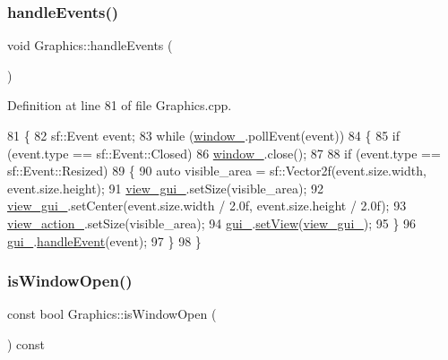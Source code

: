 \subsubsection{\texorpdfstring{handle\+Events()}{handleEvents()}}
{\footnotesize\ttfamily void Graphics\+::handle\+Events (\begin{DoxyParamCaption}{ }\end{DoxyParamCaption})}



Definition at line 81 of file Graphics.\+cpp.


\begin{DoxyCode}
81                             \{
82     sf::Event event;
83     \textcolor{keywordflow}{while} (\hyperlink{classGraphics_ac760fe1abb0b648844c9f15afa087ef6}{window\_}.pollEvent(event))
84     \{
85         \textcolor{keywordflow}{if} (event.type == sf::Event::Closed)
86             \hyperlink{classGraphics_ac760fe1abb0b648844c9f15afa087ef6}{window\_}.close();
87 
88         \textcolor{keywordflow}{if} (event.type == sf::Event::Resized)
89         \{
90             \textcolor{keyword}{auto} visible\_area = sf::Vector2f(event.size.width, event.size.height);
91             \hyperlink{classGraphics_aaca5b237fae17f3166f8f28e4c363e06}{view\_gui\_}.setSize(visible\_area);
92             \hyperlink{classGraphics_aaca5b237fae17f3166f8f28e4c363e06}{view\_gui\_}.setCenter(event.size.width / 2.0f, event.size.height / 2.0f);
93             \hyperlink{classGraphics_a60792a296f5e93dbd1d086398e20cbd0}{view\_action\_}.setSize(visible\_area);
94             \hyperlink{classGraphics_ac582857f6b0de010eabd0146c4a5f4d2}{gui\_}.\hyperlink{classGraphicalUserInterface_ab0c8cd6460442a3ad01c304ec1216631}{setView}(\hyperlink{classGraphics_aaca5b237fae17f3166f8f28e4c363e06}{view\_gui\_});
95         \}
96         \hyperlink{classGraphics_ac582857f6b0de010eabd0146c4a5f4d2}{gui\_}.\hyperlink{classGraphicalUserInterface_a71964c3c49b23a05aa3fd4b4d36aa42d}{handleEvent}(event);
97     \}
98 \}
\end{DoxyCode}
\mbox{\label{classGraphics_a21729e7f5db9080db1a766682e64c43a}} 
\subsubsection{\texorpdfstring{is\+Window\+Open()}{isWindowOpen()}}
{\footnotesize\ttfamily const bool Graphics\+::is\+Window\+Open (\begin{DoxyParamCaption}{ }\end{DoxyParamCaption}) const}



